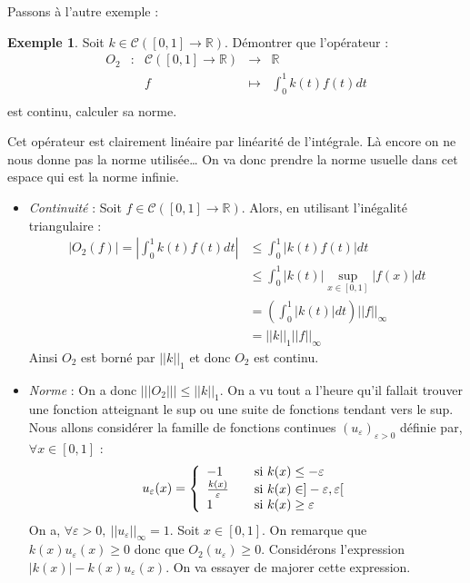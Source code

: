 \documentclass[a4paper,11pt]{article}
\theoremstyle{plain}
\theoremstyle{definition}
\newtheorem*{expl}{Exemple}
\begin{document}
Passons à l'autre exemple :
\begin{expl}
Soit $k \in \mathcal{C}\left([0,1] \to \mathbb{R}\right)$.
Démontrer que l'opérateur :
\[\begin{array}{ccccc}
O_2 & : & \mathcal{C}\left([0,1] \to \mathbb{R}\right) &\longrightarrow  &  \mathbb{R}\\
	& & f &\longmapsto& \int_0^1 k(t)f(t)dt\\
\end{array}\] 
est continu, calculer sa norme.
\end{expl}
Cet opérateur est clairement linéaire par linéarité de l'intégrale.
Là encore on ne nous donne pas la norme utilisée… On va donc prendre la norme \og usuelle \fg{} dans cet espace qui est la norme infinie.

\begin{itemize}
\item \emph{Continuité} : Soit $f \in \mathcal{C}\left([0,1] \to \mathbb{R}\right)$.
Alors, en utilisant l'inégalité triangulaire :
\[
\begin{aligned}
	|O_2(f)| = \left|\int_0^1 k(t)f(t)dt\right| & \leq \int_0^1 \left|k(t)f(t)\right|dt\\
	& \leq \int_0^1 |k(t)|\sup_{x \in [0,1]}|f(x)|dt\\
	& = \left(\int_0^1 |k(t)|dt\right) ||f||_\infty\\
	& = ||k||_1 ||f||_\infty
\end{aligned}
\]
Ainsi $O_2$ est borné par $||k||_1$ et donc $O_2$ est continu.
\item \emph{Norme} : On a donc $|||O_2||| \leq ||k||_1$.
On a vu tout a l'heure qu'il fallait trouver une fonction atteignant le sup ou une suite de fonctions tendant vers le sup.
Nous allons considérer la famille de fonctions continues $\left(u_\varepsilon\right)_{\varepsilon > 0}$ définie par, $\forall x \in [0,1]$ :
\[
 u_\varepsilon(x) = \left\{ 
  \begin{array}{l l l}
    -1 & \quad \text{si $k(x) \leq -\varepsilon$}\\
    \frac{k(x)}{\varepsilon} & \quad \text{si $k(x) \in ]-\varepsilon,\varepsilon[$}\\
    1 & \quad \text{si $k(x) \geq \varepsilon$}
  \end{array} \right.
\]
On a, $\forall \varepsilon > 0, \ ||u_\varepsilon||_\infty = 1$.
Soit $x \in [0,1]$.
On remarque que $k(x)u_\varepsilon(x) \geq 0$ donc que $O_2(u_\varepsilon) \geq 0$.
Considérons l'expression $|k(x)| - k(x)u_\varepsilon(x)$.
On va essayer de majorer cette expression.

\end{itemize}
\end{document}
